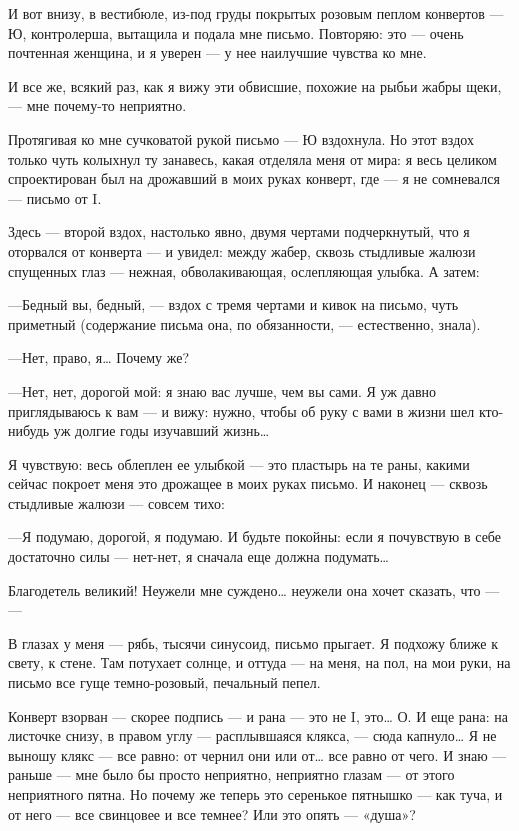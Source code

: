 \documentclass[11pt,openany]{book}
\begin{document}
И вот внизу, в вестибюле, из-под груды покрытых розовым пеплом конвертов --- Ю, контролерша, вытащила и подала мне письмо. Повторяю: это --- очень почтенная женщина, и я уверен --- у нее наилучшие чувства ко мне.

И все же, всякий раз, как я вижу эти обвисшие, похожие на рыбьи жабры щеки, --- мне почему-то неприятно.

Протягивая ко мне сучковатой рукой письмо --- Ю вздохнула. Но этот вздох только чуть колыхнул ту занавесь, какая отделяла меня от мира: я весь целиком спроектирован был на дрожавший в моих руках конверт, где --- я не сомневался --- письмо от I.

Здесь --- второй вздох, настолько явно, двумя чертами подчеркнутый, что я оторвался от конверта --- и увидел: между жабер, сквозь стыдливые жалюзи спущенных глаз --- нежная, обволакивающая, ослепляющая улыбка. А затем:

---Бедный вы, бедный, --- вздох с тремя чертами и кивок на письмо, чуть приметный (содержание письма она, по обязанности, --- естественно, знала).

---Нет, право, я\ldots{} Почему же?

---Нет, нет, дорогой мой: я знаю вас лучше, чем вы сами. Я уж давно приглядываюсь к вам --- и вижу: нужно, чтобы об руку с вами в жизни шел кто-нибудь уж долгие годы изучавший жизнь\ldots{}

Я чувствую: весь облеплен ее улыбкой --- это пластырь на те раны, какими сейчас покроет меня это дрожащее в моих руках письмо. И наконец --- сквозь стыдливые жалюзи --- совсем тихо:

---Я подумаю, дорогой, я подумаю. И будьте покойны: если я почувствую в себе достаточно силы --- нет-нет, я сначала еще должна подумать\ldots{}

Благодетель великий! Неужели мне суждено\ldots{} неужели она хочет сказать, что --- ---

В глазах у меня --- рябь, тысячи синусоид, письмо прыгает. Я подхожу ближе к свету, к стене. Там потухает солнце, и оттуда --- на меня, на пол, на мои руки, на письмо все гуще темно-розовый, печальный пепел.

Конверт взорван --- скорее подпись --- и рана --- это не I, это\ldots{} О. И еще рана: на листочке снизу, в правом углу --- расплывшаяся клякса, --- сюда капнуло\ldots{} Я не выношу клякс --- все равно: от чернил они или от\ldots{} все равно от чего. И знаю --- раньше --- мне было бы просто неприятно, неприятно глазам --- от этого неприятного пятна. Но почему же теперь это серенькое пятнышко --- как туча, и от него --- все свинцовее и все темнее? Или это опять --- «душа»?
\end{document}

